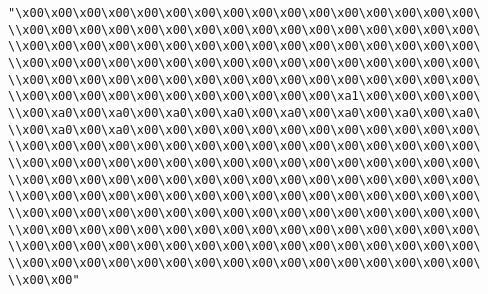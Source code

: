 \verb|"\x00\x00\x00\x00\x00\x00\x00\x00\x00\x00\x00\x00\x00\x00\x00\x00\|\newline
\verb|\\x00\x00\x00\x00\x00\x00\x00\x00\x00\x00\x00\x00\x00\x00\x00\x00\|\newline
\verb|\\x00\x00\x00\x00\x00\x00\x00\x00\x00\x00\x00\x00\x00\x00\x00\x00\|\newline
\verb|\\x00\x00\x00\x00\x00\x00\x00\x00\x00\x00\x00\x00\x00\x00\x00\x00\|\newline
\verb|\\x00\x00\x00\x00\x00\x00\x00\x00\x00\x00\x00\x00\x00\x00\x00\x00\|\newline
\verb|\\x00\x00\x00\x00\x00\x00\x00\x00\x00\x00\x00\xa1\x00\x00\x00\x00\|\newline
\verb|\\x00\xa0\x00\xa0\x00\xa0\x00\xa0\x00\xa0\x00\xa0\x00\xa0\x00\xa0\|\newline
\verb|\\x00\xa0\x00\xa0\x00\x00\x00\x00\x00\x00\x00\x00\x00\x00\x00\x00\|\newline
\verb|\\x00\x00\x00\x00\x00\x00\x00\x00\x00\x00\x00\x00\x00\x00\x00\x00\|\newline
\verb|\\x00\x00\x00\x00\x00\x00\x00\x00\x00\x00\x00\x00\x00\x00\x00\x00\|\newline
\verb|\\x00\x00\x00\x00\x00\x00\x00\x00\x00\x00\x00\x00\x00\x00\x00\x00\|\newline
\verb|\\x00\x00\x00\x00\x00\x00\x00\x00\x00\x00\x00\x00\x00\x00\x00\x00\|\newline
\verb|\\x00\x00\x00\x00\x00\x00\x00\x00\x00\x00\x00\x00\x00\x00\x00\x00\|\newline
\verb|\\x00\x00\x00\x00\x00\x00\x00\x00\x00\x00\x00\x00\x00\x00\x00\x00\|\newline
\verb|\\x00\x00\x00\x00\x00\x00\x00\x00\x00\x00\x00\x00\x00\x00\x00\x00\|\newline
\verb|\\x00\x00\x00\x00\x00\x00\x00\x00\x00\x00\x00\x00\x00\x00\x00\x00\|\newline
\verb|\\x00\x00"|\newline
